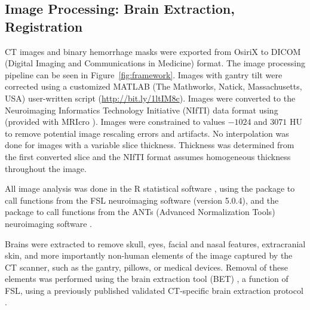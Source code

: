 \subsection{Image Processing: Brain Extraction, Registration}
CT images and binary hemorrhage masks were exported from OsiriX to DICOM (Digital Imaging and Communications in Medicine) format.   The image processing pipeline can be seen in Figure~\ref{fig:framework}.   Images with gantry tilt were corrected using a customized MATLAB (The Mathworks, Natick, Massachusetts, USA) user-written script ({\scriptsize \url{http://bit.ly/1ltIM8c}}). Images were converted to the Neuroimaging Informatics Technology Initiative (NIfTI) data format using  (provided with MRIcro \citep{rorden_stereotaxic_2000}).  Images were constrained to values $-1024$ and $3071$ HU to remove potential image rescaling errors and artifacts.   No interpolation was done for images with a variable slice thickness. Thickness was determined from the first converted slice and the NIfTI format assumes homogeneous thickness throughout the image.  

All image analysis was done in the R statistical software \citep{RCORE}, using the  \citep{muschelli2015fslr} package to call functions from the FSL \citep{jenkinson_fsl_2012} neuroimaging software (version 5.0.4), and the  package to call functions from the ANTs (Advanced Normalization Tools) neuroimaging software \citep{avants_reproducible_2011}.

Brains were extracted to remove skull, eyes, facial and nasal features, extracranial skin, and more importantly non-human elements of the image captured by the CT scanner, such as the gantry, pillows, or medical devices.  Removal of these elements was performed using the brain extraction tool (BET) \citep{smith_fast_2002}, a function of FSL, using a previously published validated CT-specific brain extraction protocol \citep{muschelli_validated_2015}.  

